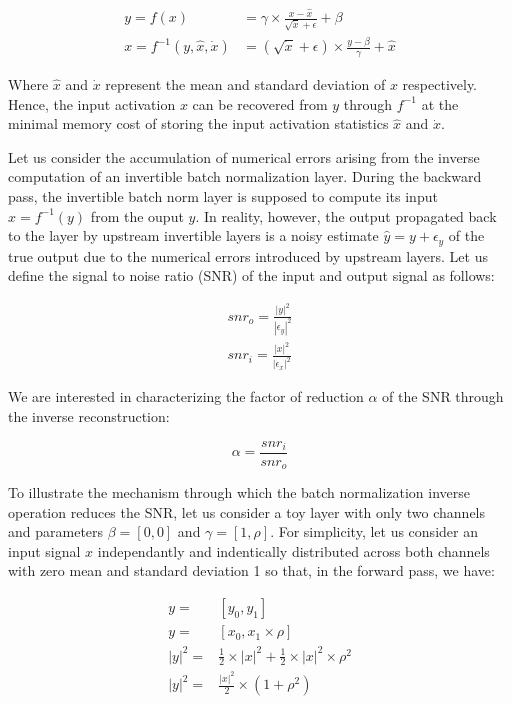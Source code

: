 \documentclass[twocolumn]{bmcart}
\begin{document}
\begin{subequations}
	\begin{align}
	y = f(x) &= \gamma \times \frac{x - \hat{x}}{\sqrt{\dot{x}} + \epsilon} + \beta \\
	x = f^{-1}(y, \hat{x}, \dot{x}) &= (\sqrt{\dot{x}} + \epsilon) \times \frac{y -  \beta}{\gamma}  + \hat{x}
	\end{align}
\end{subequations}

Where $\hat{x}$ and $\dot{x}$ represent the mean and standard deviation of $x$ respectively.
Hence, the input activation $x$ can be recovered from $y$ through $f^{-1}$ at the minimal memory cost of storing the input activation statistics $\hat{x}$ and $\dot{x}$.

Let us consider the accumulation of numerical errors arising from the inverse computation of an invertible batch normalization layer.
During the backward pass, the invertible batch norm layer is supposed to compute its input $x=f^{-1}(y)$ from the ouput $y$. 
In reality, however, the output propagated back to the layer by upstream invertible layers is a noisy estimate $\hat{y}=y+\epsilon_y$ of the true output due to the numerical errors introduced by upstream layers. 
Let us define the signal to noise ratio (SNR) of the input and output signal as follows:

\begin{subequations}
\begin{align}
snr_o = \frac{|y|^2}{|\epsilon_y|^2} \\
snr_i = \frac{|x|^2}{|\epsilon_x|^2}  
\end{align}
\end{subequations}

We are interested in characterizing the factor of reduction $\alpha$ of the SNR through the inverse reconstruction:

\begin{equation}
\alpha = \frac{snr_i}{snr_o}
\end{equation}

To illustrate the mechanism through which the batch normalization inverse operation reduces the SNR, let us consider a toy layer with only two channels and parameters $\beta=[0,0]$ and $\gamma = [1, \rho]$. For simplicity, let us consider an input signal $x$ independantly and indentically distributed across both channels with zero mean and standard deviation 1 so that, in the forward pass, we have:

\begin{subequations}
\begin{align}
 y =& [y_0, y_1] \\
 y =& [x_0, x_1 \times \rho] \\
 |y|^2 =& \frac{1}{2} \times |x|^2 + \frac{1}{2} \times |x|^2 \times \rho^2 \\
 |y|^2 =&\frac{|x|^2}{2} \times (1+\rho^2)
\end{align}
\end{subequations}
\end{document}
